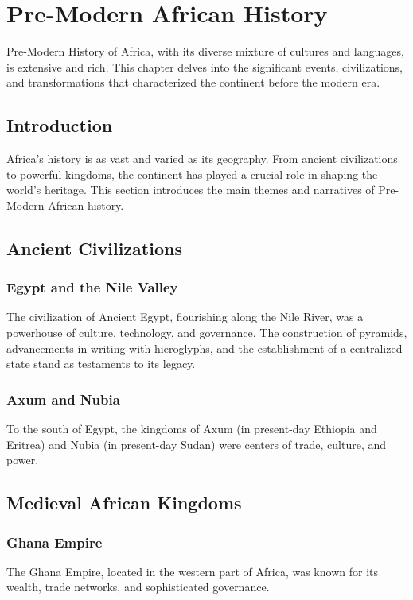 \documentclass[a4paper,12pt]{book}
\begin{document}
\chapter{Pre-Modern African History}
\label{ch:pre-modern-african-history}

Pre-Modern History of Africa, with its diverse mixture of cultures and languages, is extensive and rich. This chapter delves into the significant events, civilizations, and transformations that characterized the continent before the modern era.

\section{Introduction}
\label{sec:introduction-pre-modern-africa}

Africa’s history is as vast and varied as its geography. From ancient civilizations to powerful kingdoms, the continent has played a crucial role in shaping the world’s heritage. This section introduces the main themes and narratives of Pre-Modern African history.

\section{Ancient Civilizations}
\label{sec:ancient-civilizations}

\subsection{Egypt and the Nile Valley}
The civilization of Ancient Egypt, flourishing along the Nile River, was a powerhouse of culture, technology, and governance. The construction of pyramids, advancements in writing with hieroglyphs, and the establishment of a centralized state stand as testaments to its legacy.

\subsection{Axum and Nubia}
To the south of Egypt, the kingdoms of Axum (in present-day Ethiopia and Eritrea) and Nubia (in present-day Sudan) were centers of trade, culture, and power.

\section{Medieval African Kingdoms}
\label{sec:medieval-african-kingdoms}

\subsection{Ghana Empire}
The Ghana Empire, located in the western part of Africa, was known for its wealth, trade networks, and sophisticated governance.
\end{document}

